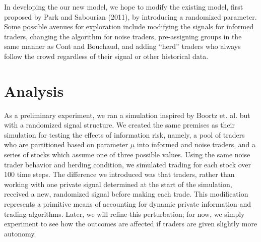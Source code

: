\documentclass{article}
\begin{document}
In developing the our new model, we hope to modify the existing model, first proposed by Park and Sabourian (2011), by introducing a randomized parameter.
Some possible avenues for exploration include modifying the signals for informed traders, changing the algorithm for noise traders, pre-assigning groups in the same manner as Cont and Bouchaud, and adding ``herd'' traders who always follow the crowd regardless of their signal or other historical data.

\section{Analysis}
As a preliminary experiment, we ran a simulation inspired by Boortz et. al. but with a randomized signal structure.
We created the same premises as their simulation for testing the effects of information risk, namely, a pool of traders who are partitioned based on parameter $\mu$ into informed and noise traders, and a series of stocks which assume one of three possible values.
Using the same noise trader behavior and herding condition, we simulated trading for each stock over 100 time steps.
The difference we introduced was that traders, rather than working with one private signal determined at the start of the simulation, received a new, randomized signal before making each trade.
This modification represents a primitive means of accounting for dynamic private information and trading algorithms. 
Later, we will refine this perturbation; for now, we simply experiment to see how the outcomes are affected if traders are given slightly more autonomy.
\end{document}
